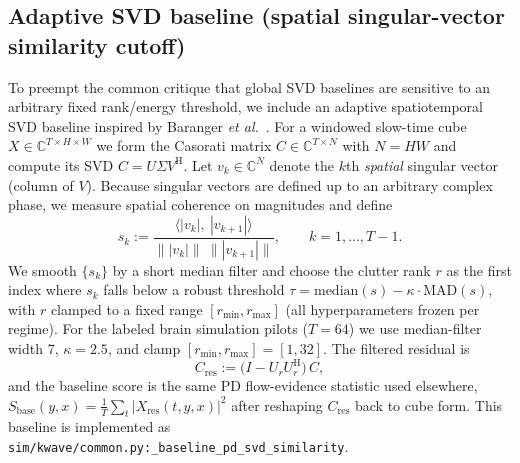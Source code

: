 \documentclass[11pt]{article}
\DeclareRobustCommand{\path}[1]{\nolinkurl{#1}}
\newcommand{\Hh}{^{\mathrm{H}}}
\begin{document}
\subsection{Adaptive SVD baseline (spatial singular-vector similarity cutoff)}
\label{app:baseline-adaptive-svd}
To preempt the common critique that global SVD baselines are sensitive to an arbitrary fixed rank/energy threshold, we include an adaptive spatiotemporal SVD baseline inspired by Baranger \emph{et al.}\ \cite{BarangerAdaptiveSVD2018}. For a windowed slow-time cube $X\in\mathbb{C}^{T\times H\times W}$ we form the Casorati matrix $C\in\mathbb{C}^{T\times N}$ with $N=HW$ and compute its SVD $C=U\Sigma V\Hh$. Let $v_k\in\mathbb{C}^{N}$ denote the $k$th \emph{spatial} singular vector (column of $V$). Because singular vectors are defined up to an arbitrary complex phase, we measure spatial coherence on magnitudes and define
\[
  s_k := \frac{\langle |v_k|,\ |v_{k+1}|\rangle}{\| |v_k|\|\ \| |v_{k+1}|\|},\qquad k=1,\dots,T-1.
\]
We smooth $\{s_k\}$ by a short median filter and choose the clutter rank $r$ as the first index where $s_k$ falls below a robust threshold $\tau=\mathrm{median}(s)-\kappa\cdot \mathrm{MAD}(s)$, with $r$ clamped to a fixed range $[r_{\min},r_{\max}]$ (all hyperparameters frozen per regime). For the labeled brain simulation pilots ($T=64$) we use median-filter width 7, $\kappa=2.5$, and clamp $[r_{\min},r_{\max}]=[1,32]$. The filtered residual is
\[
  C_{\mathrm{res}} := \bigl(I-U_rU_r\Hh\bigr)\,C,
\]
and the baseline score is the same PD flow-evidence statistic used elsewhere, $S_{\mathrm{base}}(y,x)=\frac{1}{T}\sum_t |X_{\mathrm{res}}(t,y,x)|^2$ after reshaping $C_{\mathrm{res}}$ back to cube form. This baseline is implemented as \path{sim/kwave/common.py:_baseline_pd_svd_similarity}.
\end{document}
